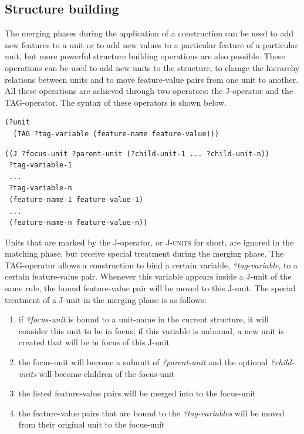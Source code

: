 \subsection{Structure building}

The merging phases during the application of a construction can be
used to add new features to a unit or to add new values to a
particular feature of a particular unit, but more powerful structure
building operations are also possible. These operations can be used to
add new units to the structure, to change the hierarchy relations
between units and to move feature-value pairs from one unit to
another. All these operations are achieved through two operators: the
J-operator \citep{debeule05hierarchy} and the TAG-operator. The syntax
of these operators is shown below.

\footnotesize
\begin{Verbatim}[frame=lines, label=Syntax of the TAG-operator]
(?unit
  (TAG ?tag-variable (feature-name feature-value)))
\end{Verbatim}

\begin{Verbatim}[frame=lines, label=Syntax of the J-operator]
((J ?focus-unit ?parent-unit (?child-unit-1 ... ?child-unit-n))
 ?tag-variable-1 
 ...
 ?tag-variable-n
 (feature-name-1 feature-value-1)
 ...
 (feature-name-n feature-value-n))
\end{Verbatim}
\normalsize

Units that are marked by the J-operator, or \textsc{J-units} for short,
are ignored in the matching phase, but receive special treatment
during the merging phase. The TAG-operator allows a construction to
bind a certain variable, \emph{?tag-variable}, to a certain
feature-value pair. Whenever this variable appears inside a J-unit of
the same rule, the bound feature-value pair will be moved to this
J-unit. The special treatment of a J-unit in the merging phase is as
follows:

\begin{enumerate}
\item if \emph{?focus-unit} is bound to a unit-name in the current
  structure, it will consider this unit to be in focus; if this
  variable is unbound, a new unit is created that will be in focus of
  this J-unit
\item the focus-unit will become a subunit of \emph{?parent-unit} and
  the optional \emph{?child-units} will become children of the
  focus-unit
\item the listed feature-value pairs will be merged into to the
  focus-unit
\item the feature-value pairs that are bound to the
  \emph{?tag-variables} will be moved from their original unit to the
  focus-unit
\end{enumerate}


